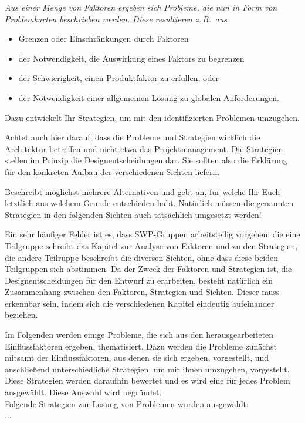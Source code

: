 \documentclass[enabledeprecatedfontcommands,fontsize=12pt,paper=a4,twoside]{scrartcl}
\begin{document}
{ \em Aus einer Menge von Faktoren ergeben sich Probleme, die nun in
  Form von Problemkarten beschrieben werden. Diese resultieren z.\,B.\
  aus
  \begin{itemize}
    \item Grenzen oder Einschränkungen durch Faktoren
    \item der Notwendigkeit, die Auswirkung eines Faktors zu begrenzen
    \item der Schwierigkeit, einen Produktfaktor zu erfüllen, oder
    \item der Notwendigkeit einer allgemeinen Lösung zu globalen
      Anforderungen.
  \end{itemize}
  Dazu entwickelt Ihr Strategien, um mit den identifizierten Problemen
  umzugehen.

  Achtet auch hier darauf, dass die Probleme und Strategien wirklich
  die Architektur betreffen und nicht etwa das Projektmanagement. Die
  Strategien stellen im Prinzip die Designentscheidungen dar. Sie
  sollten also die Erklärung für den konkreten Aufbau der
  verschiedenen Sichten liefern.

  Beschreibt möglichst mehrere Alternativen und gebt an, für welche
  Ihr Euch letztlich aus welchem Grunde entschieden habt. Natürlich
  müssen die genannten Strategien in den folgenden Sichten auch
  tatsächlich umgesetzt werden!

  Ein sehr häufiger Fehler ist es, dass SWP-Gruppen arbeitsteilig
  vorgehen: die eine Teilgruppe schreibt das Kapitel zur Analyse von
  Faktoren und zu den Strategien, die andere Teilruppe beschreibt die
  diversen Sichten, ohne dass diese beiden Teilgruppen sich abstimmen.
  Da der Zweck der Faktoren und Strategien ist, die
  Designentscheidungen für den Entwurf zu erarbeiten, besteht
  natürlich ein Zusammenhang zwischen den Faktoren, Strategien und
  Sichten. Dieser muss erkennbar sein, indem sich die verschiedenen
  Kapitel eindeutig aufeinander beziehen.
}
Im Folgenden werden einige Probleme, die sich aus den herausgearbeiteten Einflussfaktoren ergeben, thematisiert. Dazu werden die Probleme zunächst mitsamt der Einflussfaktoren, aus denen sie sich ergeben, vorgestellt, und anschließend unterschiedliche Strategien, um mit ihnen umzugehen, vorgestellt. \\ Diese Strategien werden daraufhin bewertet und es wird eine für jedes Problem ausgewählt. Diese Auswahl wird begründet. \\ 
Folgende Strategien zur Lösung von Problemen wurden ausgewählt: \\
...
\end{document}
